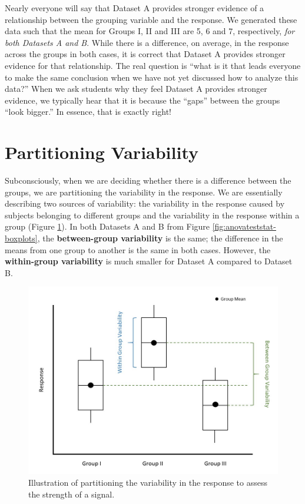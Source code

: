\documentclass[
]{book}
\theoremstyle{plain}
\theoremstyle{mydefn}
\theoremstyle{myexmpl}
\theoremstyle{remark}
\begin{document}
Nearly everyone will say that Dataset A provides stronger evidence of a relationship between the grouping variable and the response. We generated these data such that the mean for Groups I, II and III are 5, 6 and 7, respectively, \emph{for both Datasets A and B}. While there is a difference, on average, in the response across the groups in both cases, it is correct that Dataset A provides stronger evidence for that relationship. The real question is ``what is it that leads everyone to make the same conclusion when we have not yet discussed how to analyze this data?'' When we ask students why they feel Dataset A provides stronger evidence, we typically hear that it is because the ``gaps'' between the groups ``look bigger.'' In essence, that is exactly right!

\hypertarget{partitioning-variability-1}{%
\section{Partitioning Variability}\label{partitioning-variability-1}}

Subconsciously, when we are deciding whether there is a difference between the groups, we are partitioning the variability in the response. We are essentially describing two sources of variability: the variability in the response caused by subjects belonging to different groups and the variability in the response within a group (Figure \ref{fig:anovateststat-partition-variability}). In both Datasets A and B from Figure \ref{fig:anovateststat-boxplots}, the \textbf{between-group variability} is the same; the difference in the means from one group to another is the same in both cases. However, the \textbf{within-group variability} is much smaller for Dataset A compared to Dataset B.

\begin{figure}

{\centering \includegraphics[width=0.8\linewidth]{./images/ANOVATestStat-Partition-Variability} 

}

\caption{Illustration of partitioning the variability in the response to assess the strength of a signal.}\label{fig:anovateststat-partition-variability}
\end{figure}
\end{document}
